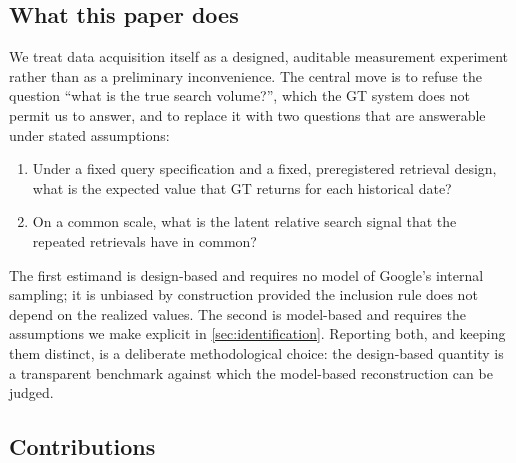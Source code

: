 \documentclass[12pt,a4paper,oneside]{article}
\begin{document}
\subsection{What this paper does}

We treat data acquisition itself as a designed, auditable measurement
experiment rather than as a preliminary inconvenience. The central move is to
refuse the question ``what is the true search volume?'', which the GT system does
not permit us to answer, and to replace it with two questions that are
answerable under stated assumptions:

\begin{enumerate}
\item Under a fixed query specification and a fixed, preregistered retrieval
design, what is the expected value that GT returns for each historical date?
\item On a common scale, what is the latent relative search signal that the
repeated retrievals have in common?
\end{enumerate}

The first estimand is design-based and requires no model of Google's internal
sampling; it is unbiased by construction provided the inclusion rule does not
depend on the realized values. The second is model-based and requires the
assumptions we make explicit in \cref{sec:identification}. Reporting both, and
keeping them distinct, is a deliberate methodological choice: the design-based
quantity is a transparent benchmark against which the model-based reconstruction
can be judged.

\subsection{Contributions}
\end{document}
